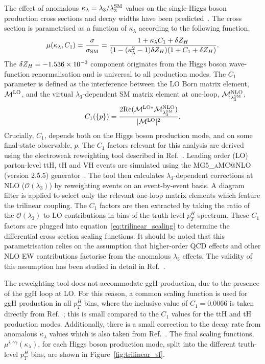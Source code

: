 The effect of anomalous $\kappa_\lambda=\lambda_3/\lambda_3^{\rm{SM}}$ values on the single-Higgs boson production cross sections and decay widths have been predicted~\cite{Maltoni:2017ims}. The cross section is parametrised as a function of $\kappa_\lambda$ according to the following function,
\begin{equation}\label{eq:trilinear_scaling}
    \mu(\kappa_\lambda,C_1) = \frac{\sigma}{\sigma_{\rm{SM}}} = \frac{1+\kappa_\lambda C_1 + \delta Z_H}{(1-(\kappa_\lambda^2-1)\delta Z_H)(1+C_1+\delta Z_H)}.
\end{equation}
The $\delta Z_H=-1.536\times10^{\rm{-3}}$ component originates from the Higgs boson wave-function renormalisation and is universal to all production modes. The $C_1$ parameter is defined as the interference between the LO Born matrix element, $\mathcal{M}^{\rm{LO}}$, and the virtual $\lambda_3$-dependent SM matrix element at one-loop, $\mathcal{M}^{\rm{NLO}}_{\lambda_3^{\rm{SM}}}$, 
\begin{equation}
    C_1(\{p\}) = \frac{2{\rm{Re}}(\mathcal{M}^{{\rm{LO}}*}\mathcal{M}^{\rm{NLO}}_{\lambda_3^{\rm{SM}}})}{|\mathcal{M}^{{\rm{LO}}}|^2}.
\end{equation}
\noindent
Crucially, $C_1$, depends both on the Higgs boson production mode, and on some final-state observable, $p$. The $C_1$ factors relevant for this analysis are derived using the electroweak reweighting tool described in Ref.~\cite{EWreweightingtool}. Leading order (LO) parton-level ttH, tH and VH events are simulated using the \textsc{MG5\_aMC@NLO} (version 2.5.5) generator~\cite{Alwall:2014hca}. The tool then calculates $\lambda_3$-dependent corrections at NLO ($\mathcal{O}(\lambda_3)$) by reweighting events on an event-by-event basis. A diagram filter is applied to select only the relevant one-loop matrix elements which feature the trilinear coupling. The $C_1$ factors are then extracted by taking the ratio of the $\mathcal{O}(\lambda_3)$ to LO contributions in bins of the truth-level $p_T^H$ spectrum. These $C_1$ factors are plugged into equation~\ref{eq:trilinear_scaling} to determine the differential cross section scaling functions. It should be noted that this parametrisation relies on the assumption that higher-order QCD effects and other NLO EW contributions factorise from the anomalous $\lambda_3$ effects. The validity of this assumption has been studied in detail in Ref.~\cite{Maltoni:2017ims}.

The reweighting tool does not accommodate ggH production, due to the presence of the ggH loop at LO. For this reason, a common scaling function is used for ggH production in all $p_T^H$ bins, where the inclusive value of $C_1=0.0066$ is taken directly from Ref.~\cite{Degrassi:2016wml}; this is small compared to the $C_1$ values for the ttH and tH production modes. Additionally, there is a small correction to the \Hgg decay rate from anomalous $\kappa_\lambda$ values which is also taken from Ref.~\cite{Degrassi:2016wml}. The final scaling functions, $\mu^{i,\gamma\gamma}(\kappa_\lambda)$, for each Higgs boson production mode, split into the different truth-level $p_T^H$ bins, are shown in Figure~\ref{fig:trilinear_sf}.

